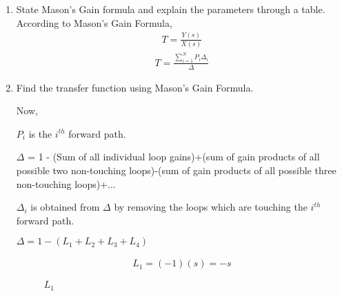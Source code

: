 \begin{enumerate}[label=\thesection.\arabic*.,ref=\thesection.\theenumi]
\item State Mason's Gain formula and explain the parameters through a table.
\\
\solution 
According to Mason's Gain Formula,
\begin{align}
T = \frac{Y(s)}{X(s)} 
\end{align}
\begin{align}
T = \frac{\sum_{i=1}^{N} P_i\Delta_i}{\Delta}
\end{align}
\item  Find the transfer function using Mason's Gain Formula.
\renewcommand{\thefigure}{\theenumi.\arabic{figure}}
%
\\
\solution 




Now, 

$P_i$ is the $i^{th}$ forward path.

$\Delta$ = 1 - (Sum of all individual loop gains)+(sum of gain products of all possible two non-touching loops)-(sum of gain products of all possible three non-touching loops)+...

$\Delta_i$ is  obtained from $\Delta$ by removing the loops which are touching the $i^{th}$ forward path.


$\Delta = 1-(L_1 + L_2 + L_3 + L_4)$

\begin{align}
L_1=(-1)(s)=-s
\end{align}

\begin{figure}[!ht]
\begin{center}
		
		\resizebox{\columnwidth}{!}{}
	\end{center}
\caption{$L_1$}
\label{fig:sec_order}
\end{figure}



\end{enumerate}

